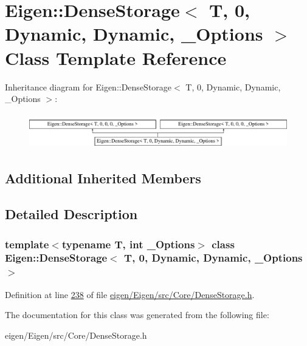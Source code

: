 \hypertarget{class_eigen_1_1_dense_storage_3_01_t_00_010_00_01_dynamic_00_01_dynamic_00_01___options_01_4}{}\section{Eigen\+:\+:Dense\+Storage$<$ T, 0, Dynamic, Dynamic, \+\_\+\+Options $>$ Class Template Reference}
\label{class_eigen_1_1_dense_storage_3_01_t_00_010_00_01_dynamic_00_01_dynamic_00_01___options_01_4}
Inheritance diagram for Eigen\+:\+:Dense\+Storage$<$ T, 0, Dynamic, Dynamic, \+\_\+\+Options $>$\+:\begin{figure}[H]
\begin{center}
\leavevmode
\includegraphics[height=1.555556cm]{class_eigen_1_1_dense_storage_3_01_t_00_010_00_01_dynamic_00_01_dynamic_00_01___options_01_4}
\end{center}
\end{figure}
\subsection*{Additional Inherited Members}


\subsection{Detailed Description}
\subsubsection*{template$<$typename T, int \+\_\+\+Options$>$\newline
class Eigen\+::\+Dense\+Storage$<$ T, 0, Dynamic, Dynamic, \+\_\+\+Options $>$}



Definition at line \hyperlink{eigen_2_eigen_2src_2_core_2_dense_storage_8h_source_l00238}{238} of file \hyperlink{eigen_2_eigen_2src_2_core_2_dense_storage_8h_source}{eigen/\+Eigen/src/\+Core/\+Dense\+Storage.\+h}.



The documentation for this class was generated from the following file\+:\begin{DoxyCompactItemize}
\item 
eigen/\+Eigen/src/\+Core/\+Dense\+Storage.\+h\end{DoxyCompactItemize}
